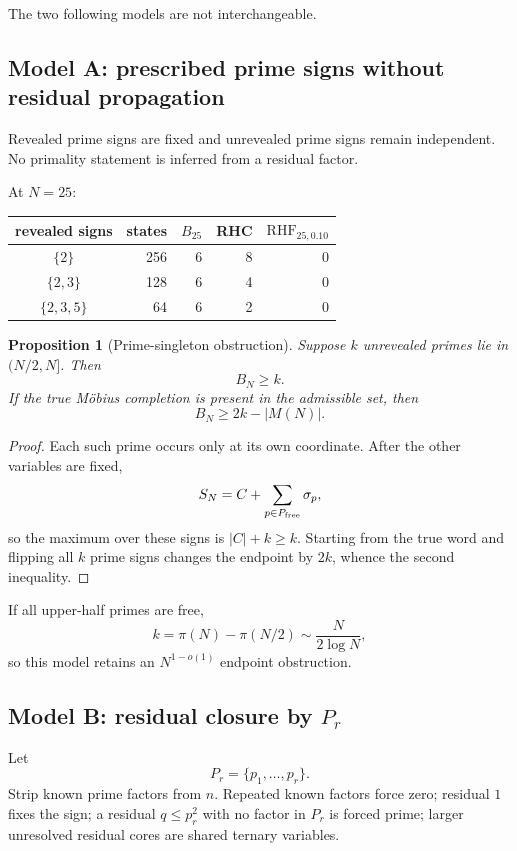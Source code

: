 \documentclass[11pt]{article}
\newtheorem{proposition}[theorem]{Proposition}
\newcommand{\RHF}{\mathrm{RHF}}
\begin{document}
The two following models are not interchangeable.

\subsection{Model A: prescribed prime signs without residual propagation}

Revealed prime signs are fixed and unrevealed prime signs remain independent.  No primality statement is inferred from a residual factor.

At $N=25$:
\begin{center}
\begin{tabular}{c r r r r}
\toprule
revealed signs & states & $B_{25}$ & RHC & $\RHF_{25,0.10}$\\
\midrule
$\{2\}$&256&6&8&0\\
$\{2,3\}$&128&6&4&0\\
$\{2,3,5\}$&64&6&2&0\\
\bottomrule
\end{tabular}
\end{center}

\begin{proposition}[Prime-singleton obstruction]
Suppose $k$ unrevealed primes lie in $(N/2,N]$.  Then
\[
 B_N\ge k.
\]
If the true M\"obius completion is present in the admissible set, then
\[
 \boxed{B_N\ge 2k-|M(N)|}.
\]
\end{proposition}

\begin{proof}
Each such prime occurs only at its own coordinate.  After the other variables are fixed,
\[
 S_N=C+\sum_{p\in P_{\rm free}}\sigma_p,
\]
so the maximum over these signs is $|C|+k\ge k$.  Starting from the true word and flipping all $k$ prime signs changes the endpoint by $2k$, whence the second inequality.
\end{proof}

If all upper-half primes are free,
\[
 k=\pi(N)-\pi(N/2)\sim\frac{N}{2\log N},
\]
so this model retains an $N^{1-o(1)}$ endpoint obstruction.

\subsection{Model B: residual closure by $P_r$}

Let
\[
 P_r=\{p_1,\ldots,p_r\}.
\]
Strip known prime factors from $n$.  Repeated known factors force zero; residual $1$ fixes the sign; a residual $q\le p_r^2$ with no factor in $P_r$ is forced prime; larger unresolved residual cores are shared ternary variables.
\end{document}
